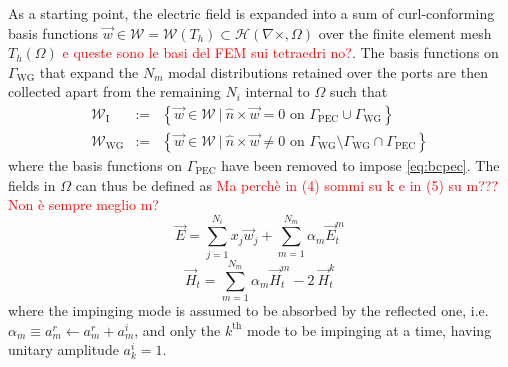 \documentclass[AMA,STIX2COL]{WileyNJD-v2}
\begin{document}
As a starting point, the electric field is expanded into a sum of  curl-conforming basis functions $\vec{w} \in \mathcal{W} = \mathcal{W}(T_h) \subset \mathcal{H}(\nabla \times, \Omega)$ \cite{ingelstrom2006new} over the finite element mesh $T_h(\Omega)$ \textcolor{red}{e queste sono le basi del FEM sui tetraedri no?}. The basis functions on $\Gamma_\text{WG}$ that expand the $N_m$ modal distributions retained over the ports are then collected apart from the remaining $N_i$ internal to $\Omega$ such that 
\begin{eqnarray*}
\mathcal{W}_\text{I} & := & \left\lbrace \vec{w} \in \mathcal{W} \ | \ \hat{n} \times \vec{w} = 0 \text{ on } \Gamma_\text{PEC} \cup \Gamma_\text{WG}  \right\rbrace\\
\mathcal{W}_\text{WG} & := & \left\lbrace \vec{w} \in \mathcal{W} \ | \  \hat{n} \times \vec{w} \neq 0 \text{ on } \Gamma_\text{WG} \setminus \Gamma_\text{WG} \cap \Gamma_\text{PEC} \right\rbrace
\end{eqnarray*}
\noindent where the basis functions on $\Gamma_\text{PEC}$ have been removed to impose \eqref{eq:bcpec}. The fields in $\Omega$ can thus be defined as \cite{ZhuCangellaris}\textcolor{red}{Ma perchè in (4) sommi su k e in (5) su m??? Non è sempre meglio m?}
\begin{equation}
\label{eq:basisE}
\vec{E} = \sum_{j=1}^{N_i} x_j \vec{w}_j + \sum_{m=1}^{N_m} \alpha_m \vec{E}_t^m
\end{equation}
\begin{equation*}
\label{eq:basisH}
\vec{H}_t = \sum_{m=1}^{N_m} \alpha_m \vec{H}_t^m - 2 \ \vec{H}_t^k
\end{equation*}
\noindent where the impinging mode is assumed to be absorbed by the reflected one, i.e. $\alpha_m \equiv a_m^r \leftarrow a_m^r + a_m^i$, and only the $k^\text{th}$ mode to be impinging at a time, having unitary amplitude $a_k^i = 1$.
\end{document}
